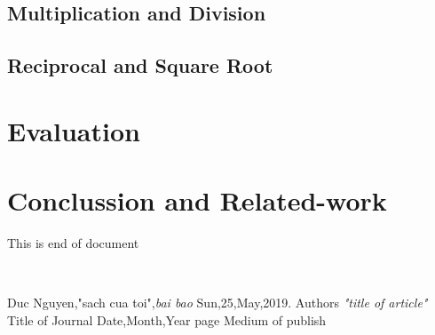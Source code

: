 \documentclass[11pt,a4paper,vietnamese]{report}
\begin{document}
\section{Multiplication and Division}
\section{Reciprocal and Square Root}
\chapter{Evaluation}

\chapter{Conclussion and Related-work}
This is end of document

\cite{name1}\\

\pagebreak
\begin{thebibliography}{}
Duc Nguyen,"sach cua toi",\textit{bai bao} Sun,25,May,2019.
Authors
\textit{"title of article"}
Title of Journal
Date,Month,Year
page
Medium of publish
\end{thebibliography}
\end{document}
